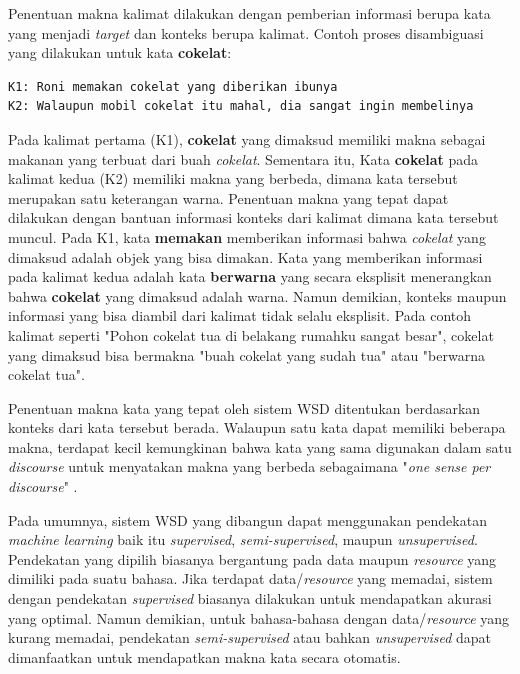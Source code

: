 Penentuan makna kalimat dilakukan dengan pemberian informasi berupa kata yang menjadi \textit{target} dan konteks berupa kalimat. Contoh proses disambiguasi yang dilakukan untuk kata \textbf{cokelat}:

\begin{lstlisting}
K1: Roni memakan cokelat yang diberikan ibunya
K2: Walaupun mobil cokelat itu mahal, dia sangat ingin membelinya
\end{lstlisting}


Pada kalimat pertama (K1), \textbf{cokelat} yang dimaksud memiliki makna sebagai makanan yang terbuat dari buah \textit{cokelat}. Sementara itu, Kata \textbf{cokelat} pada kalimat kedua (K2) memiliki makna yang berbeda, dimana kata tersebut merupakan satu keterangan warna. Penentuan makna yang tepat dapat dilakukan dengan bantuan informasi konteks dari kalimat dimana kata tersebut muncul. Pada K1, kata \textbf{memakan} memberikan informasi bahwa \textit{cokelat} yang dimaksud adalah objek yang bisa dimakan. Kata yang memberikan informasi pada kalimat kedua adalah kata \textbf{berwarna} yang secara eksplisit menerangkan bahwa \textbf{cokelat} yang dimaksud adalah warna. Namun demikian, konteks maupun informasi yang bisa diambil dari kalimat tidak selalu eksplisit. Pada contoh kalimat seperti "Pohon cokelat tua di belakang rumahku sangat besar", cokelat yang dimaksud bisa bermakna "buah cokelat yang sudah tua" atau "berwarna cokelat tua".

Penentuan makna kata yang tepat oleh sistem WSD ditentukan berdasarkan konteks dari kata tersebut berada. Walaupun satu kata dapat memiliki beberapa makna, terdapat kecil kemungkinan bahwa kata yang sama digunakan dalam satu \textit{discourse} untuk menyatakan makna yang berbeda sebagaimana "\textit{one sense per discourse}" \citep{gale1992one}.

Pada umumnya, sistem WSD yang dibangun dapat menggunakan pendekatan \textit{machine learning} baik itu \textit{supervised}, \textit{semi-supervised}, maupun \textit{unsupervised}. Pendekatan yang dipilih biasanya bergantung pada data maupun \textit{resource} yang dimiliki pada suatu bahasa. Jika terdapat data/\textit{resource} yang memadai, sistem dengan pendekatan \textit{supervised} biasanya dilakukan untuk mendapatkan akurasi yang optimal. Namun demikian, untuk bahasa-bahasa dengan data/\textit{resource} yang kurang memadai, pendekatan \textit{semi-supervised} atau bahkan \textit{unsupervised} dapat dimanfaatkan untuk mendapatkan makna kata secara otomatis.

